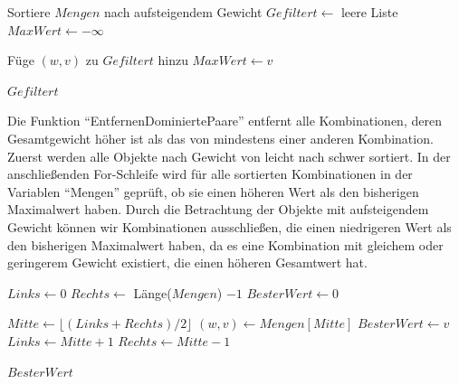 \begin{algorithmic}
    \State \vspace{0.5em}

    \State Sortiere $Mengen$ nach aufsteigendem Gewicht
    \State $Gefiltert \leftarrow$ leere Liste
    \State $MaxWert \leftarrow -\infty$
    
            \State Füge $(w, v)$ zu $Gefiltert$ hinzu
            \State $MaxWert \leftarrow v$
        \EndIf
    \EndFor

    \State \Return $Gefiltert$
    \EndFunction

\end{algorithmic}

Die Funktion \enquote{EntfernenDominiertePaare} entfernt alle Kombinationen, deren Gesamtgewicht höher ist als das von mindestens einer anderen Kombination. Zuerst werden alle Objekte nach Gewicht von leicht nach schwer sortiert. In der anschließenden For-Schleife wird für alle sortierten Kombinationen in der Variablen \enquote{Mengen} geprüft, ob sie einen höheren Wert als den bisherigen Maximalwert haben. Durch die Betrachtung der Objekte mit aufsteigendem Gewicht können wir Kombinationen ausschließen, die einen niedrigeren Wert als den bisherigen Maximalwert haben, da es eine Kombination mit gleichem oder geringerem Gewicht existiert, die einen höheren Gesamtwert hat.

\begin{algorithmic}
    \State \vspace{0.5em}
    
    \State $Links \leftarrow 0$
    \State $Rechts \leftarrow$ Länge($Mengen$) $- 1$
    \State $BesterWert \leftarrow 0$

        \State $Mitte \leftarrow \lfloor(Links + Rechts) / 2\rfloor$
        \State $(w, v) \leftarrow Mengen[Mitte]$
            \State $BesterWert \leftarrow v$
            \State $Links \leftarrow Mitte + 1$
        \Else
            \State $Rechts \leftarrow Mitte - 1$
        \EndIf
    \EndWhile

    \State \Return $BesterWert$
    \EndFunction
\end{algorithmic}

